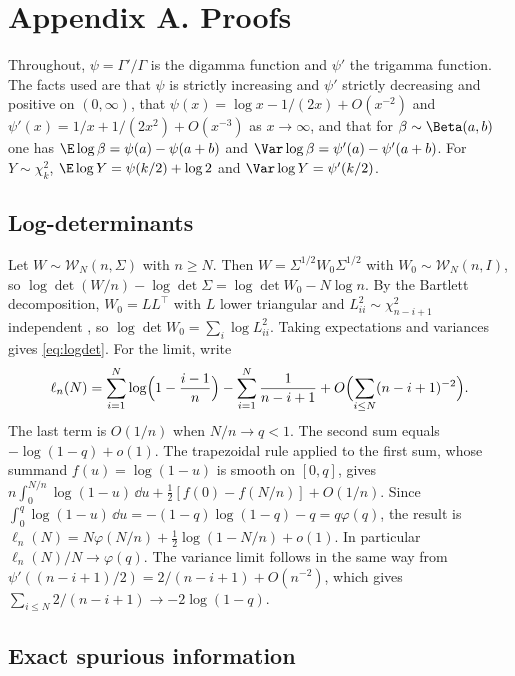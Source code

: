 \section*{Appendix A. Proofs}

Throughout, $\psi=\Gamma'/\Gamma$ is the digamma function and $\psi'$ the trigamma function. The facts used are that $\psi$ is strictly increasing and $\psi'$ strictly decreasing and positive on $(0,\infty)$, that $\psi(x)=\log x-1/(2x)+O(x^{-2})$ and $\psi'(x)=1/x+1/(2x^2)+O(x^{-3})$ as $x\to\infty$, and that for $\beta\sim\Beta(a,b)$ one has $\E\log\beta=\psi(a)-\psi(a+b)$ and $\Var\log\beta=\psi'(a)-\psi'(a+b)$. For $Y\sim\chi^2_k$, $\E\log Y=\psi(k/2)+\log2$ and $\Var\log Y=\psi'(k/2)$.

\subsection*{Log-determinants}

Let $W\sim\mathcal W_N(n,\Sigma)$ with $n\ge N$. Then $W=\Sigma^{1/2}W_0\Sigma^{1/2}$ with $W_0\sim\mathcal W_N(n,I)$, so $\log\det(W/n)-\log\det\Sigma=\log\det W_0-N\log n$. By the Bartlett decomposition, $W_0=LL^\top$ with $L$ lower triangular and $L_{ii}^2\sim\chi^2_{n-i+1}$ independent \citep[Ch.~3]{muirhead1982aspects}, so $\log\det W_0=\sum_i\log L_{ii}^2$. Taking expectations and variances gives \eqref{eq:logdet}. For the limit, write
\[
 \ell_n(N)=\sum_{i=1}^N\log\Bigl(1-\frac{i-1}n\Bigr)-\sum_{i=1}^N\frac1{n-i+1}+O\Bigl(\sum_{i\le N}(n-i+1)^{-2}\Bigr).
\]
The last term is $O(1/n)$ when $N/n\to q<1$. The second sum equals $-\log(1-q)+o(1)$. The trapezoidal rule applied to the first sum, whose summand $f(u)=\log(1-u)$ is smooth on $[0,q]$, gives $n\int_0^{N/n}\log(1-u)\,\dd u+\tfrac12[f(0)-f(N/n)]+O(1/n)$. Since $\int_0^q\log(1-u)\,\dd u=-(1-q)\log(1-q)-q=q\varphi(q)$, the result is $\ell_n(N)=N\varphi(N/n)+\tfrac12\log(1-N/n)+o(1)$. In particular $\ell_n(N)/N\to\varphi(q)$. The variance limit follows in the same way from $\psi'((n-i+1)/2)=2/(n-i+1)+O(n^{-2})$, which gives $\sum_{i\le N}2/(n-i+1)\to-2\log(1-q)$.

\subsection*{Exact spurious information}

